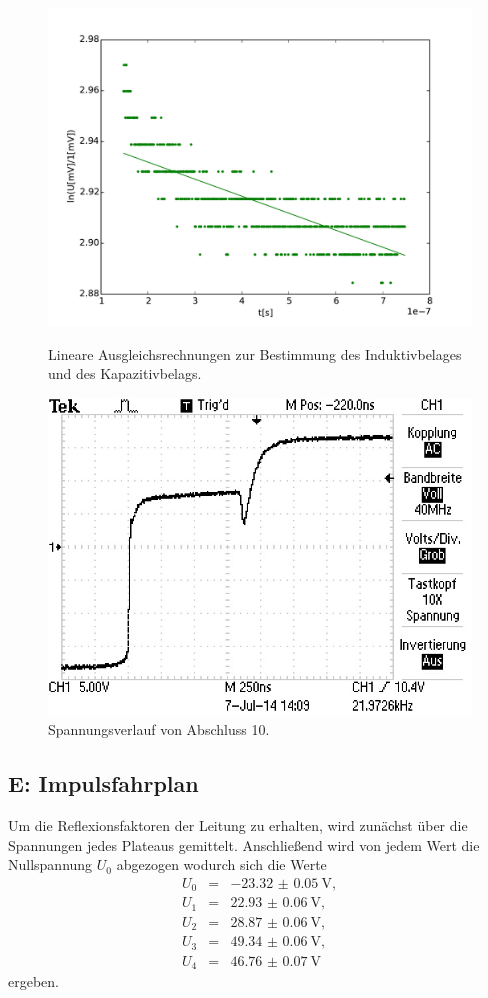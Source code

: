 \begin{figure}
	\centering
	\includegraphics[width = 14cm]{data/d/Regression3.pdf}
	\caption{Lineare Ausgleichsrechnungen zur Bestimmung des Induktivbelages und des Kapazitivbelags.}
	\includegraphics[width = 12cm]{data/d/F0007TEK.JPG}
	\caption{Spannungsverlauf von Abschluss 10.}
	\label{fig_abs10}
\end{figure}

\FloatBarrier
\subsection{E: Impulsfahrplan} %
\label{sub:subsection_name}

Um die Reflexionsfaktoren der Leitung zu erhalten, wird zunächst über die Spannungen jedes Plateaus gemittelt.
Anschließend wird von jedem Wert die Nullspannung $U_0$ abgezogen wodurch sich die Werte
\begin{eqnarray}
	U_0 &=& \SI{-23.32(5)}{\volt},\\
	U_1 &=& \SI{22.93(6)}{\volt},\\
	U_2 &=& \SI{28.87(6)}{\volt},\\
	U_3 &=& \SI{49.34(6)}{\volt},\\
	U_4 &=& \SI{46.76(7)}{\volt}
\end{eqnarray}
ergeben.

